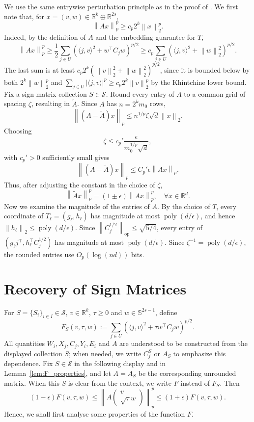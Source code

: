 \documentclass[11pt]{article}
\theoremstyle{remark}
\theoremstyle{definition}
\newcommand{\Sph}{\mathbb{S}}
\newcommand{\R}{\mathbb{R}}
\newcommand{\eps}{\epsilon}
\newcommand{\cS}{\mathcal{S}}
\newcommand{\ip}[2]{\langle #1,#2\rangle}
\newcommand{\norm}[1]{\left\|#1\right\|}
\newcommand{\op}{\textrm{op}}
\DeclareMathOperator{\poly}{poly}
\begin{document}
We use the same entrywise perturbation principle as in the proof of \cite[Theorem 5.1]{LWW21}. We first note that, for $x = (v, w) \in \R^k \oplus \R^{2s}$,
\[
	\norm{Ax}_p^p \geq c_p 2^k \norm{x}_2^p.
\]
Indeed, by the definition of $A$ and the embedding guarantee for $T$,
\[
	\norm{Ax}_p^p \geq \frac12 \sum_{j\in U}\left(\ip{j}{v}^2 + w^\top C_jw\right)^{p/2}
	\geq c_p\sum_{j\in U}\left(\ip{j}{v}^2+\norm{w}_2^2\right)^{p/2}.
\]
The last sum is at least $c_p2^k(\norm{v}_2^2+\norm{w}_2^2)^{p/2}$, since it is bounded below by both $2^k\norm{w}_2^p$ and $\sum_{j\in U}|\ip{j}{v}|^p\geq c_p2^k\norm{v}_2^p$ by the Khintchine lower bound.
Fix a sign matrix collection $S\in \cS$. Round every entry of $A$ to a common grid of spacing $\zeta$, resulting in $\widetilde{A}$. Since $A$ has $n = 2^k m_0$ rows,
\[
	\norm{(A-\widetilde{A})x}_p \leq n^{1/p}\zeta\sqrt{d}\norm{x}_2.
\]
Choosing
\[
	\zeta \leq c_p'\frac{\eps}{m_0^{1/p}\sqrt{d}},
\]
with $c_p'>0$ sufficiently small gives
\[
	\norm{(A-\widetilde{A})x}_p \leq C_p'\eps \norm{Ax}_p.
\]
Thus, after adjusting the constant in the choice of $\zeta$,
\[
	\norm{\widetilde{A}x}_p^p = (1\pm \eps)\norm{Ax}_p^p, \quad \forall x\in\R^d.
\]
Now we examine the magnitude of the entries of $A$. By the choice of $T$, every coordinate of $T_\ell=(g_\ell,h_\ell)$ has magnitude at most $\poly(d/\eps)$, and hence $\norm{h_\ell}_2\leq \poly(d/\eps)$. Since $\norm{C_j^{1/2}}_{\op}\leq \sqrt{5/4}$, every entry of $(g_\ell j^\top,h_\ell^\top C_j^{1/2})$ has magnitude at most $\poly(d/\eps)$. Since $\zeta^{-1}=\poly(d/\eps)$, the rounded entries use $O_p(\log(nd))$ bits.

\section{Recovery of Sign Matrices}

For $S=\{S_i\}_{i\in I}\in\cS$, $v\in \R^k$, $\tau \geq 0$ and
$w\in \Sph^{2s-1}$, define
\[
	F_S(v,\tau,w)
	:= \sum_{j\in U} (\langle j,v\rangle^2 + \tau w^\top C_j w)^{p/2}.
\]
All quantities $W_i,X_j,C_j,Y_i,E_i$ and $A$ are understood to be constructed
from the displayed collection $S$; when needed, we write $C_j^S$ or $A_S$ to
emphasize this dependence.
Fix $S\in\cS$ in the following display and in Lemma~\ref{lem:F_properties}, and let $A=A_S$ be the corresponding unrounded matrix.
When this $S$ is clear from the context, we write $F$ instead of $F_S$. Then
\begin{equation}\label{eqn:A_approximates_F}
	(1-\eps)F(v,\tau,w)
	\leq 
	\norm{ A \begin{pmatrix}
			v\\
			\sqrt{\tau}w
	\end{pmatrix} }_p^p 
	\leq (1+\eps)F(v,\tau,w).
\end{equation}
Hence, we shall first analyse some properties of the function $F$.
\end{document}
